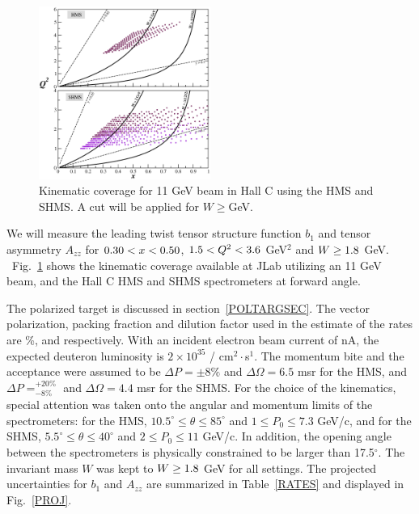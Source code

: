 \begin{figure}
\begin{center}
\includegraphics[width=0.5\textwidth]{figs/plots0705/cov_split_hallC.eps}
\caption{\label{kincov} Kinematic coverage for 11 GeV beam in Hall C using the HMS and SHMS.  A cut will be applied for $W\ge$\WMIN GeV.}
\end{center}
\end{figure}

\label{EXP}
We will measure the leading twist tensor structure
function $b_1$ and tensor asymmetry $A_{zz}$ 
for $0.30<x<0.50$, $1.5<Q^2<3.6$ GeV$^2$ and $W \ge 1.8$ GeV. ~Fig.~\ref{kincov} 
shows the kinematic coverage available at JLab utilizing an 11 GeV beam, 
and the Hall C HMS and SHMS spectrometers at forward angle.


The polarized \TARGET target is discussed in section~\ref{POLTARGSEC}.  
The vector polarization, packing fraction and
dilution factor used in the estimate of the rates are \PZ\%, \PF and \DF respectively. With an incident
electron beam current of \CURRENT nA, the
expected deuteron luminosity is $2\times 10^{35}$ / cm$^2\cdot$s$^1$. The momentum bite and the acceptance
were assumed to be $\Delta P = \pm 8\%$ and $\Delta\Omega = 6.5$ msr for the HMS, and $\Delta P= ^{+20\%}_{-8\%}$ 
and $\Delta\Omega =4.4$ msr for the SHMS. 
%
For the choice of the kinematics,
special attention was taken onto the angular and momentum limits of the spectrometers: for the
HMS, $10.5^{\circ} \le \theta \le 85^{\circ}$ and $1 \le P_0 \le 7.3$ GeV/c, and for the SHMS,
$5.5^{\circ} \le \theta \le 40^{\circ}$ and $2 \le P_0 \le 11$ GeV/c. In addition, the
opening angle between the spectrometers is physically constrained to be larger than 17.5$^{\circ}$.
The invariant mass $W$ was kept to $W \ge 1.8$ GeV for all settings.
The projected 
uncertainties for $b_1$ and $A_{zz}$
are summarized in Table~\ref{RATES} and displayed in
Fig.~\ref{PROJ}.  

